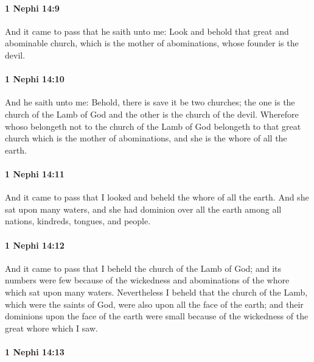 		\paragraph{1 Nephi 14:9} %
			\label{1NEPHI-14-9}

			And it came to pass that he saith unto me:
			Look and behold that great and abominable church,
			which is the mother of abominations, whose founder is the devil.

		\paragraph{1 Nephi 14:10} %
			\label{1NEPHI-14-10}

			And he saith unto me:
			Behold, there is save it be two churches;
			the one is the church of the Lamb of God
			and the other is the church of the devil.
			Wherefore whoso belongeth not to the church of the Lamb of God
			belongeth to that great church which is the mother of abominations,
			and she is the whore of all the earth.

		\paragraph{1 Nephi 14:11} %
			\label{1NEPHI-14-11}

			And it came to pass that I looked and beheld the whore of all the earth.
			And she sat upon many waters,
			and she had dominion over all the earth
			among all nations, kindreds, tongues, and people.

		\paragraph{1 Nephi 14:12} %
			\label{1NEPHI-14-12}

			And it came to pass that I beheld the church of the Lamb of God;
			and its numbers were few
			because of the wickedness and abominations of the whore
			which sat upon many waters.
			Nevertheless I beheld that the church of the Lamb, which were the saints of God,
			were also upon all the face of the earth;
			and their dominions upon the face of the earth were small
			because of the wickedness of the great whore which I saw.

		\paragraph{1 Nephi 14:13} %
			\label{1NEPHI-14-13}

